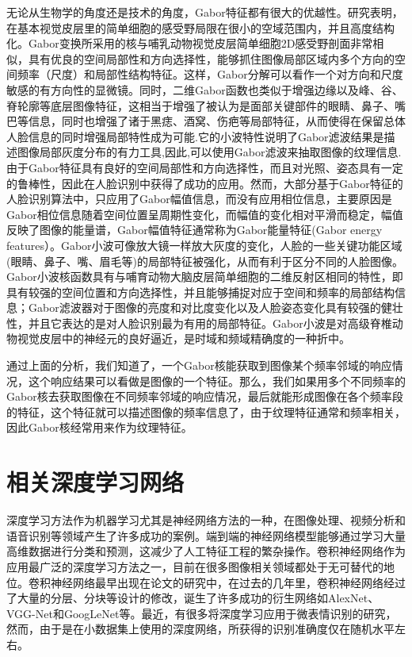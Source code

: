 无论从生物学的角度还是技术的角度，Gabor特征都有很大的优越性。研究表明，在基本视觉皮层里的简单细胞的感受野局限在很小的空域范围内，并且高度结构化。Gabor变换所采用的核与哺乳动物视觉皮层简单细胞2D感受野剖面非常相似，具有优良的空间局部性和方向选择性，能够抓住图像局部区域内多个方向的空间频率（尺度）和局部性结构特征。这样，Gabor分解可以看作一个对方向和尺度敏感的有方向性的显微镜。同时，二维Gabor函数也类似于增强边缘以及峰、谷、脊轮廓等底层图像特征，这相当于增强了被认为是面部关键部件的眼睛、鼻子、嘴巴等信息，同时也增强了诸于黑痣、酒窝、伤疤等局部特征，从而使得在保留总体人脸信息的同时增强局部特性成为可能.它的小波特性说明了Gabor滤波结果是描述图像局部灰度分布的有力工具,因此,可以使用Gabor滤波来抽取图像的纹理信息. 由于Gabor特征具有良好的空间局部性和方向选择性，而且对光照、姿态具有一定的鲁棒性，因此在人脸识别中获得了成功的应用。然而，大部分基于Gabor特征的人脸识别算法中，只应用了Gabor幅值信息，而没有应用相位信息，主要原因是Gabor相位信息随着空间位置呈周期性变化，而幅值的变化相对平滑而稳定，幅值反映了图像的能量谱，Gabor幅值特征通常称为Gabor能量特征(Gabor energy features）。Gabor小波可像放大镜一样放大灰度的变化，人脸的一些关键功能区域(眼睛、鼻子、嘴、眉毛等)的局部特征被强化，从而有利于区分不同的人脸图像。Gabor小波核函数具有与哺育动物大脑皮层简单细胞的二维反射区相同的特性，即具有较强的空间位置和方向选择性，并且能够捕捉对应于空间和频率的局部结构信息；Gabor滤波器对于图像的亮度和对比度变化以及人脸姿态变化具有较强的健壮性，并且它表达的是对人脸识别最为有用的局部特征。Gabor小波是对高级脊椎动物视觉皮层中的神经元的良好逼近，是时域和频域精确度的一种折中。

通过上面的分析，我们知道了，一个Gabor核能获取到图像某个频率邻域的响应情况，这个响应结果可以看做是图像的一个特征。那么，我们如果用多个不同频率的Gabor核去获取图像在不同频率邻域的响应情况，最后就能形成图像在各个频率段的特征，这个特征就可以描述图像的频率信息了，由于纹理特征通常和频率相关，因此Gabor核经常用来作为纹理特征。

\section{相关深度学习网络}

深度学习方法作为机器学习尤其是神经网络方法的一种，在图像处理、视频分析和语音识别等领域产生了许多成功的案例。端到端的神经网络模型能够通过学习大量高维数据进行分类和预测，这减少了人工特征工程的繁杂操作。卷积神经网络作为应用最广泛的深度学习方法之一，目前在很多图像相关领域都处于无可替代的地位。卷积神经网络最早出现在论文的研究中，在过去的几年里，卷积神经网络经过了大量的分层、分块等设计的修改，诞生了许多成功的衍生网络如AlexNet\citep{krizhevsky2012imagenet}、VGG-Net\citep{Simonyan2014Very}和GoogLeNet\citep{szegedy2015going}等。最近，有很多将深度学习应用于微表情识别的研究，然而，由于是在小数据集上使用的深度网络，所获得的识别准确度仅在随机水平左右。

